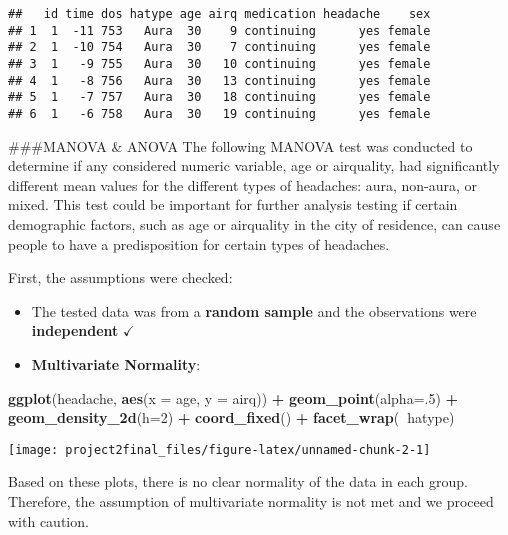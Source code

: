 \documentclass[]{article}
\newenvironment{Shaded}{\begin{snugshade}}{\end{snugshade}}
\newcommand{\DataTypeTok}[1]{\textcolor[rgb]{0.13,0.29,0.53}{#1}}
\newcommand{\DecValTok}[1]{\textcolor[rgb]{0.00,0.00,0.81}{#1}}
\newcommand{\KeywordTok}[1]{\textcolor[rgb]{0.13,0.29,0.53}{\textbf{#1}}}
\newcommand{\NormalTok}[1]{#1}
\newcommand{\OperatorTok}[1]{\textcolor[rgb]{0.81,0.36,0.00}{\textbf{#1}}}
\newcommand{\StringTok}[1]{\textcolor[rgb]{0.31,0.60,0.02}{#1}}
\providecommand{\tightlist}{%
  \setlength{\itemsep}{0pt}\setlength{\parskip}{0pt}}
\begin{document}
\begin{verbatim}
##   id time dos hatype age airq medication headache    sex
## 1  1  -11 753   Aura  30    9 continuing      yes female
## 2  1  -10 754   Aura  30    7 continuing      yes female
## 3  1   -9 755   Aura  30   10 continuing      yes female
## 4  1   -8 756   Aura  30   13 continuing      yes female
## 5  1   -7 757   Aura  30   18 continuing      yes female
## 6  1   -6 758   Aura  30   19 continuing      yes female
\end{verbatim}

\#\#\#MANOVA \& ANOVA The following MANOVA test was conducted to
determine if any considered numeric variable, age or airquality, had
significantly different mean values for the different types of
headaches: aura, non-aura, or mixed. This test could be important for
further analysis testing if certain demographic factors, such as age or
airquality in the city of residence, can cause people to have a
predisposition for certain types of headaches.

First, the assumptions were checked:

\begin{itemize}
\tightlist
\item
  The tested data was from a \textbf{random sample} and the observations
  were \textbf{independent} \(\checkmark\)
\item
  \textbf{Multivariate Normality}:
\end{itemize}

\begin{Shaded}
\begin{Highlighting}[]
\KeywordTok{ggplot}\NormalTok{(headache, }\KeywordTok{aes}\NormalTok{(}\DataTypeTok{x =}\NormalTok{ age, }\DataTypeTok{y =}\NormalTok{ airq)) }\OperatorTok{+}\StringTok{ }
\StringTok{  }\KeywordTok{geom_point}\NormalTok{(}\DataTypeTok{alpha=}\NormalTok{.}\DecValTok{5}\NormalTok{) }\OperatorTok{+}\StringTok{ }\KeywordTok{geom_density_2d}\NormalTok{(}\DataTypeTok{h=}\DecValTok{2}\NormalTok{) }\OperatorTok{+}
\StringTok{  }\KeywordTok{coord_fixed}\NormalTok{() }\OperatorTok{+}\StringTok{ }\KeywordTok{facet_wrap}\NormalTok{(}\OperatorTok{~}\NormalTok{hatype)}
\end{Highlighting}
\end{Shaded}

\begin{center}\texttt{[image: project2final\_files/figure-latex/unnamed-chunk-2-1]} \end{center}

Based on these plots, there is no clear normality of the data in each
group. Therefore, the assumption of multivariate normality is not met
and we proceed with caution.
\end{document}
